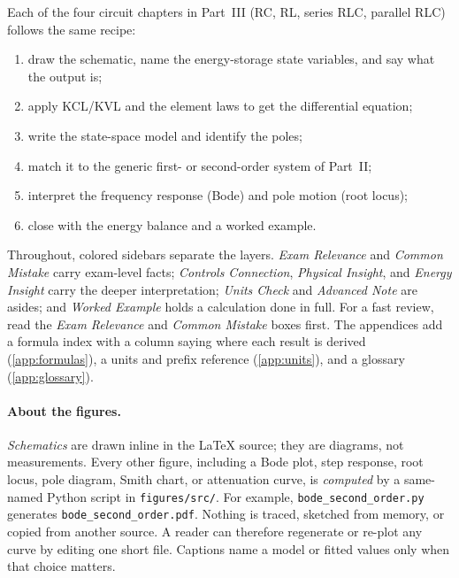 Each of the four circuit chapters in Part~III (RC, RL, series RLC, parallel RLC)
follows the same recipe:
\begin{enumerate}
\item draw the schematic, name the energy-storage state variables, and say what the
output is;
\item apply KCL/KVL and the element laws to get the differential equation;
\item write the state-space model and identify the poles;
\item match it to the generic first- or second-order system of Part~II;
\item interpret the frequency response (Bode) and pole motion (root locus);
\item close with the energy balance and a worked example.
\end{enumerate}

Throughout, colored sidebars separate the layers. \emph{Exam Relevance} and
\emph{Common Mistake} carry exam-level facts; \emph{Controls Connection},
\emph{Physical Insight}, and \emph{Energy Insight} carry the deeper interpretation;
\emph{Units Check} and \emph{Advanced Note} are asides; and \emph{Worked Example}
holds a calculation done in full. For a fast review, read the \emph{Exam Relevance}
and \emph{Common Mistake} boxes first. The appendices add a formula index with a
column saying where each result is derived (\cref{app:formulas}), a units and prefix
reference (\cref{app:units}), and a glossary (\cref{app:glossary}).

\paragraph{About the figures.}
\emph{Schematics} are drawn inline in the \LaTeX{} source; they are diagrams, not
measurements. Every other figure, including a Bode plot, step response, root locus,
pole diagram, Smith chart, or attenuation curve, is \emph{computed} by a same-named
Python script in \texttt{figures/src/}. For example,
\texttt{bode\_second\_order.py} generates \texttt{bode\_second\_order.pdf}.
Nothing is traced, sketched from memory, or copied from another source. A reader can
therefore regenerate or re-plot any curve by editing one short file. Captions name a
model or fitted values only when that choice matters.
